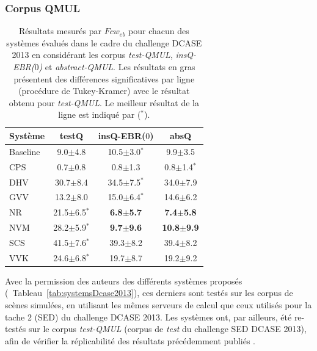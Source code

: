 \subsubsection{Corpus QMUL}

\begin{table}[t] 
\begin{center}  
\begin{tabular}{lccc}  
Système  & testQ & insQ-EBR($0$) & absQ \\ 
\hline 
Baseline & 9.0$\pm$4.8      & 10.5$\pm$3.0$^*$     & 9.9$\pm$3.5 \\ 
CPS      & 0.7$\pm$0.8      & 0.8$\pm$1.3          & 0.8$\pm$1.4$^*$ \\ 
DHV      & 30.7$\pm$8.4     & 34.5$\pm$7.5$^*$     & 34.0$\pm$7.9 \\ 
GVV      & 13.2$\pm$8.0     & 15.0$\pm$6.4$^*$     & 14.6$\pm$6.2 \\ 
NR       & 21.5$\pm$6.5$^*$ & \textbf{6.8$\pm$5.7} & \textbf{7.4$\pm$5.8} \\ 
NVM      & 28.2$\pm$5.9$^*$ & \textbf{9.7$\pm$9.6} & \textbf{10.8$\pm$9.9} \\ 
SCS      & 41.5$\pm$7.6$^*$ & 39.3$\pm$8.2         & 39.4$\pm$8.2 \\ 
VVK      & 24.6$\pm$6.8$^*$ & 19.7$\pm$8.7         & 19.2$\pm$9.2 \\  
\hline
\end{tabular} 
\end{center} 
\caption[Résultats mesurés par $Fcw_{eb}$ pour chacun des systèmes évalués dans le cadre du challenge DCASE 2013 en considérant les corpus \emph{test-QMUL}, \emph{insQ-EBR($0$)} et \emph{abstract-QMUL}.]{Résultats mesurés par $Fcw_{eb}$ pour chacun des systèmes évalués dans le cadre du challenge DCASE 2013 en considérant les corpus \emph{test-QMUL}, \emph{insQ-EBR($0$)} et \emph{abstract-QMUL}. Les résultats en gras présentent des différences significatives par ligne (procédure de Tukey-Kramer) avec le résultat obtenu pour \emph{test-QMUL}. Le meilleur résultat de la ligne est indiqué par ($^*$).} 
\label{tab:qmul} 
\end{table} 

Avec la permission des auteurs des différents systèmes proposés (\cf~Tableau~\ref{tab:systemsDcase2013}), ces derniers sont testés sur les corpus de scènes simulées, en utilisant les mêmes serveurs de calcul que ceux utilisés pour la tache 2 (SED) du challenge DCASE 2013. Les systèmes ont, par ailleurs, été re-testés sur le corpus \emph{test-QMUL} (corpus de \emph{test} du challenge SED DCASE 2013), afin de vérifier la réplicabilité des résultats précédemment publiés \citep{Stowell15}.

